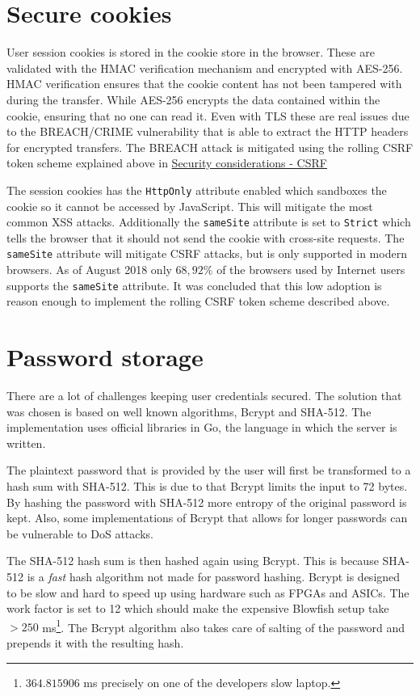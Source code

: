\documentclass[12pt,a4paper]{report}
\begin{document}
\section{Secure cookies}
\label{subsec:secure-cookies}
User session cookies is stored in the cookie store in the browser. These are validated with the HMAC verification mechanism and encrypted with AES-256. HMAC verification ensures that the cookie content has not been tampered with during the transfer\cite{fips-198}. While AES-256 encrypts the data contained within the cookie, ensuring that no one can read it\cite{fips-197}. Even with TLS these are real issues due to the BREACH/CRIME vulnerability that is able to extract the HTTP headers for encrypted transfers\cite{breach}. The BREACH attack is mitigated using the rolling CSRF token scheme explained above in \hyperref[subsec:csrf]{Security considerations - CSRF}

The session cookies has the \texttt{HttpOnly} attribute enabled which sandboxes the cookie so it cannot be accessed by JavaScript. This will mitigate the most common XSS attacks\cite{owasp-httponly}. Additionally the \texttt{sameSite} attribute is set to \texttt{Strict} which tells the browser that it should not send the cookie with cross-site requests\cite{owasp-samesite}. The \texttt{sameSite} attribute will mitigate CSRF attacks, but is only supported in modern browsers. As of August 2018 only $68,92 \%$ of the browsers used by Internet users supports the \texttt{sameSite} attribute\cite{owasp-samesite-support}. It was concluded that this low adoption is reason enough to implement the rolling CSRF token scheme described above.

\section{Password storage}
There are a lot of challenges keeping user credentials secured. The solution that was chosen is based on well known algorithms, Bcrypt and SHA-512. The implementation uses official libraries in Go, the language in which the server is written.

The plaintext password that is provided by the user will first be transformed to a hash sum with SHA-512. This is due to that Bcrypt limits the input to 72 bytes. By hashing the password with SHA-512 more entropy of the original password is kept. Also, some implementations of Bcrypt that allows for longer passwords can be vulnerable to DoS attacks\cite{bcrypt-length}.

The SHA-512 hash sum is then hashed again using Bcrypt. This is because
SHA-512 is a \textit{fast} hash algorithm not made for password hashing. Bcrypt is
designed to be slow and hard to speed up using hardware such as FPGAs and
ASICs. The work factor is set to 12 which should make the expensive Blowfish
setup take $> 250$ ms\footnote{$364.815906$ ms precisely on one of the developers slow laptop.}.
The Bcrypt algorithm also takes care of salting of the password and prepends 
it with the resulting hash.
\end{document}
